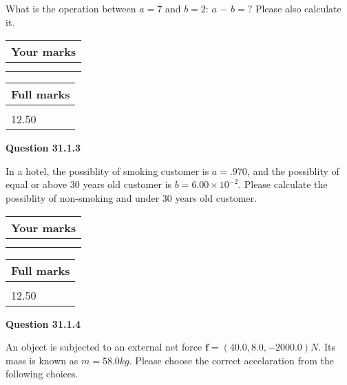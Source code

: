 \documentclass[12pt]{article}
\begin{document}
  
What is the operation between $a= %
7$ and $b= %
2$:
$a$  %
$-$ $b=?$ Please also calculate it.

 
\vspace{0.3in}
  
\vspace{0.2in}
  
         \begin{tabular}{|l|}
\hline
 Your marks  \\
\hline
 \\ 
 \\ 
\hline
\end{tabular}
\hspace{0.05in} \begin{tabular}{|l|}
\hline
 Full marks  \\
\hline
 \\ 
12.50 \\
\hline
\end{tabular}
{\textbf{\Large{Question
31.1.3 
}}}
  
  
In a hotel, the possiblity of  %
smoking customer is
$a =  %
.970$, and the possiblity of  %
equal or above 30 years old customer is $ b =  %
6.00 \times 10^{-2}$.
Please calculate the possiblity of  %
 non-smoking and  %
under 30 years old customer.
 

 

 
\vspace{0.3in}
  
\vspace{0.2in}
  
         \begin{tabular}{|l|}
\hline
 Your marks  \\
\hline
 \\ 
 \\ 
\hline
\end{tabular}
\hspace{0.05in} \begin{tabular}{|l|}
\hline
 Full marks  \\
\hline
 \\ 
12.50 \\
\hline
\end{tabular}
{\textbf{\Large{Question
31.1.4 
}}}
  
  
 
An object is subjected to an external net force $\mathbf{f}=(
40.0 ,
8.0,
-2000.0  )N$. Its mass is known as
$m= %
58.0  kg$. Please choose the correct accelaration
from the following choices.
 
\end{document}
